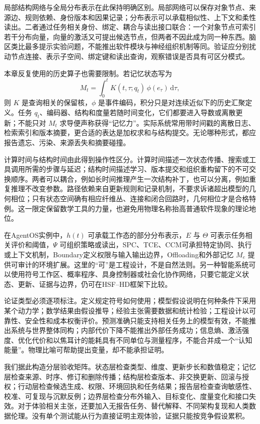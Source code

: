 局部结构网络与全局分布表示在此保持明确区别。局部网络可以保存对象节点、来源边、规则依赖、身份版本和因果记录；分布表示可以承载相似性、上下文和柔性读出。二者通过任务相关身份、绑定、耦合与读出接口联合：一个对象节点可索引若干分布向量，向量的激活又可提出候选节点，但两者不因此成为同一种东西。脑区类比最多提示实验问题，不能推出软件模块与神经组织机制等同。验证应分别扰动节点连接、表示子空间、绑定键和读出查询，观察错误是否具有可区分模式。

本章反复使用的历史算子也需要限制。若记忆状态写为
\[
M_t=\int_{0}^{t}K(t,\tau;q_t)\,\phi(e_\tau)\,\mathrm d\tau,
\]
则 $K$ 是查询相关的保留核，$\phi$ 是事件编码，积分只是对连续近似下的历史汇聚定义。任务 $q_t$、编码器、结构和度量若随时间变化，它们都要进入导数或离散更新；不能只对 $M_t$ 求导便声称获得“记忆力”。实际系统常用带时间戳的离散日志、检索索引和版本摘要，更合适的表达是加权求和与结构提交。无论哪种形式，都应报告遗忘、污染、来源丢失和摘要碰撞。

计算时间与结构时间由此得到操作性区分。计算时间描述一次状态传播、搜索或工具调用所需的步骤与延迟；结构时间描述学习、版本提交和组织重构留下的不可交换顺序。两者可以耦合，例如长时间推理产生一次结构补丁，也可以分离，例如重复推理不改变参数。路径依赖来自更新规则和记录机制，不要求诉诸超出模型的几何相位；只有状态空间确有相应纤维丛、连接和闭合回路时，几何相位才是合格特例。这一限定保留数学工具的力量，也避免用物理名称抬高普通软件现象的理论地位。

在AgentOS实例中，$h(t)$ 可承载工作态的部分分布表示，$E$ 与 $\Theta$ 可表示任务相关评价和阈值，$\Psi$ 可组织策略或读出，SPC、TCE、CCM可承担特定协同、执行或上下文机制，Boundary定义权限与输入输出边界，Offloading和外部记忆 $M_e$ 提供可审计的环境扩展。这里的“可”是工程设计，不是自然法则。另一种智能系统可以使用符号工作区、概率程序、具身控制器或社会化协作网络，只要它能定义状态、更新、证据与边界，仍可在HSF--HD框架下比较。

论证类型必须逐项标注。定义规定符号如何使用；模型假设说明在何种条件下采用某个动力学；数学结果由假设推导；经验主张需要数据和统计检验；工程设计以可靠性、安全性和成本权衡评价。预测准确只能支持相关任务上的模型有效，不能推出系统与世界整体同构；内部代价下降不能推出外部任务成功；信息熵、激活强度、优化代价和以焦耳计的能耗具有不同单位与测量程序，不能合并成一个“认知能量”。物理比喻可帮助提出变量，却不能承担证明。

我们据此构造分层验收矩阵。状态层检查类型、维度、更新步长和数值稳定；记忆层检查来源、时序、修订和删除传播；结构层检查版本、非交换更新、回滚与授权；行动层检查候选生成、权限、环境回执和任务结果；报告层检查查询敏感性、校准、可复现与沉默反例；边界层检查分布外输入、目标变化、度量变化和接口失效。对于体验相关主张，还要加入无报告任务、替代解释、不同架构复现和人类数据伦理。没有单个测试能从行为直接证明主观体验，证据只能按竞争假设累积。

